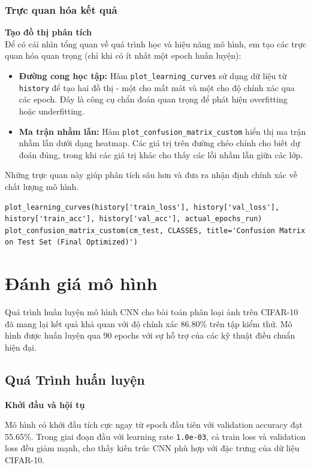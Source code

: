 \documentclass[12pt, a4paper, openany]{report}
\begin{document}
\subsection{Trực quan hóa kết quả}
\textbf{Tạo đồ thị phân tích} \\
Để có cái nhìn tổng quan về quá trình học và hiệu năng mô hình, em tạo các trực quan hóa quan trọng (chỉ khi có ít nhất một epoch huấn luyện):
\begin{itemize}
    \item \textbf{Đường cong học tập:} Hàm \texttt{plot\_learning\_curves} sử dụng dữ liệu từ \texttt{history} để tạo hai đồ thị - một cho mất mát và một cho độ chính xác qua các epoch. Đây là công cụ chẩn đoán quan trọng để phát hiện overfitting hoặc underfitting.
    \item \textbf{Ma trận nhầm lẫn:} Hàm \texttt{plot\_confusion\_matrix\_custom} hiển thị ma trận nhầm lẫn dưới dạng heatmap. Các giá trị trên đường chéo chính cho biết dự đoán đúng, trong khi các giá trị khác cho thấy các lỗi nhầm lẫn giữa các lớp.
\end{itemize}
Những trực quan này giúp phân tích sâu hơn và đưa ra nhận định chính xác về chất lượng mô hình.

\begin{verbatim}
plot_learning_curves(history['train_loss'], history['val_loss'],
history['train_acc'], history['val_acc'], actual_epochs_run)
plot_confusion_matrix_custom(cm_test, CLASSES, title='Confusion Matrix on Test Set (Final Optimized)')
\end{verbatim}

\chapter{Đánh giá mô hình}
Quá trình huấn luyện mô hình CNN cho bài toán phân loại ảnh trên CIFAR-10 đã mang lại kết quả khả quan với độ chính xác 86.80\% trên tập kiểm thử. Mô hình được huấn luyện qua 90 epochs với sự hỗ trợ của các kỹ thuật điều chuẩn hiện đại.

\section{Quá Trình huấn luyện}
\textbf{Khởi đầu và hội tụ} 

Mô hình có khởi đầu tích cực ngay từ epoch đầu tiên với validation accuracy đạt 55.65\%. Trong giai đoạn đầu với learning rate \texttt{1.0e-03}, cả train loss và validation loss đều giảm mạnh, cho thấy kiến trúc CNN phù hợp với đặc trưng của dữ liệu CIFAR-10.
\end{document}
